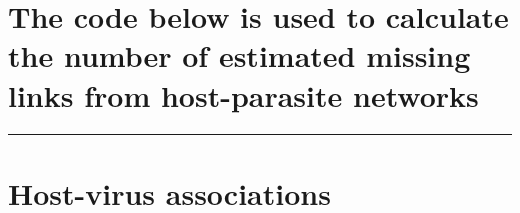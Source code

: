 \documentclass[
]{article}
\begin{document}
\hypertarget{the-code-below-is-used-to-calculate-the-number-of-estimated-missing-links-from-host-parasite-networks}{%
\section{The code below is used to calculate the number of estimated
missing links from host-parasite
networks}\label{the-code-below-is-used-to-calculate-the-number-of-estimated-missing-links-from-host-parasite-networks}}

\begin{center}\rule{0.5\linewidth}{0.5pt}\end{center}

\hypertarget{host-virus-associations}{%
\section{Host-virus associations}\label{host-virus-associations}}
\end{document}
